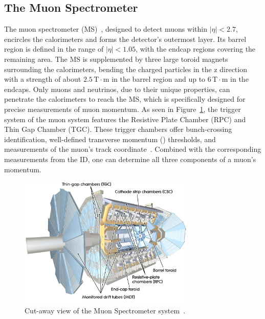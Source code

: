 \subsection{The Muon Spectrometer}

The muon spectrometer (MS)~\cite{ATLAS:1997ad}, designed to detect muons within \(|\eta| < 2.7\), encircles the calorimeters and forms the detector's outermost layer. Its barrel region is defined in the range of \(|\eta| < 1.05\), with the endcap regions covering the remaining area.
The MS is supplemented by three large toroid magnets surrounding the calorimeters, bending the charged particles in the z direction with a strength of about \(2.5 \, \text{T}\cdot\text{m}\) in the barrel region and up to \(6 \, \text{T}\cdot\text{m}\) in the endcaps.
Only muons and neutrinos, due to their unique properties, can penetrate the calorimeters to reach the MS, which is specifically designed for precise measurements of muon momentum.
As seen in Figure~\ref{fig:muon_spec}, the trigger system of the muon system features the Resistive Plate Chamber (RPC) and Thin Gap Chamber (TGC). These trigger chambers offer bunch-crossing identification, well-defined transverse momentum (\pt) thresholds, and measurements of the muon's track coordinate~\cite{TheATLASCollaboration_2008}.
Combined with the corresponding measurements from the ID, one can determine all three components of a muon's momentum.

\begin{figure}[ht]
    \centering
    \includegraphics[width=0.75\textwidth]{figures/LHC/muon_spec.jpg}
    \caption[]{Cut-away view of the Muon Spectrometer system~\cite{Pequenao:1095929}.}
    \label{fig:muon_spec}
\end{figure}



























